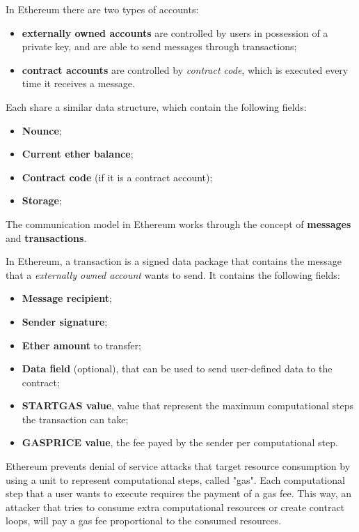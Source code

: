 In Ethereum there are two types of accounts:

\begin{itemize}
	\item \textbf{externally owned accounts} are controlled by users in possession of a private key, and are able to send messages through transactions;
	\item \textbf{contract accounts} are controlled by \textit{contract code}, which is executed every time it receives a message.
\end{itemize}

Each share a similar data structure, which contain the following fields:
\begin{itemize}
	\item \textbf{Nounce};
	\item \textbf{Current ether balance};
	\item \textbf{Contract code} (if it is a contract account);
	\item \textbf{Storage};
\end{itemize}

The communication model in Ethereum works through the concept of \textbf{messages} and \textbf{transactions}.

In Ethereum, a transaction is a signed data package that contains the message that a \textit{externally owned account} wants to send. It contains the following fields:

\begin{itemize}
	\item \textbf{Message recipient};
	\item \textbf{Sender signature};
	\item \textbf{Ether amount} to transfer;
	\item \textbf{Data field} (optional), that can be used to send user-defined data to the contract;
	\item \textbf{STARTGAS value}, value that represent the maximum computational steps the transaction can take;
	\item \textbf{GASPRICE value}, the fee payed by the sender per computational step.
\end{itemize}

Ethereum prevents denial of service attacks that target resource consumption by using a unit to represent computational steps, called "gas".
Each computational step that a user wants to execute requires the payment of a gas fee.
This way, an attacker that tries to consume extra computational resources or create contract loops, will pay a gas fee proportional to the consumed resources.

